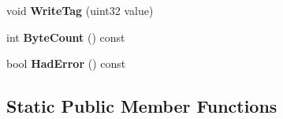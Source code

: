 \begin{DoxyCompactItemize}
void {\bfseries Write\+Tag} (uint32 value)
\item 
\mbox{\label{classgoogle_1_1protobuf_1_1io_1_1CodedOutputStream_a7fd2979d7f48935c63b0c82d208901d0}} 
int {\bfseries Byte\+Count} () const
\item 
\mbox{\label{classgoogle_1_1protobuf_1_1io_1_1CodedOutputStream_a71b6dbf65afbbe9b0bcb34961cf4c2fc}} 
bool {\bfseries Had\+Error} () const
\end{DoxyCompactItemize}
\subsection*{Static Public Member Functions}
